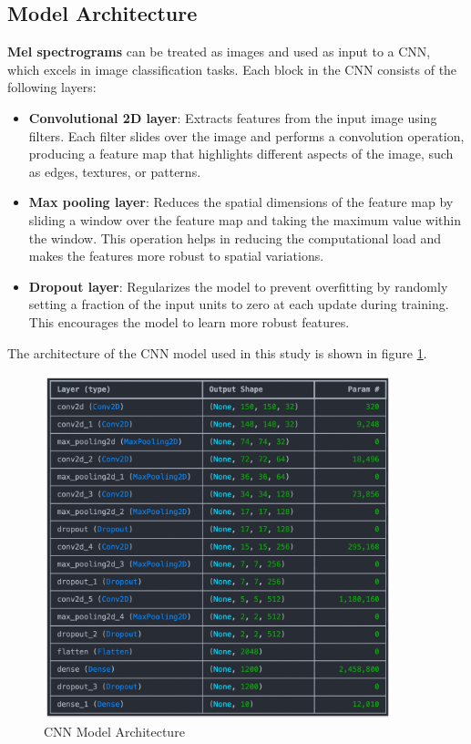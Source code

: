 \documentclass[11.5pt]{article}
\begin{document}
\subsection{Model Architecture}
\textbf{Mel spectrograms} can be treated as images and used as input to a CNN, which excels in image classification tasks. Each block in the CNN consists of the following layers:
\begin{itemize}
    \item \textbf{Convolutional 2D layer}: Extracts features from the input image using filters. Each filter slides over the image and performs a convolution operation, producing a feature map that highlights different aspects of the image, such as edges, textures, or patterns.
    \item \textbf{Max pooling layer}: Reduces the spatial dimensions of the feature map by sliding a window over the feature map and taking the maximum value within the window. This operation helps in reducing the computational load and makes the features more robust to spatial variations.
    \item \textbf{Dropout layer}: Regularizes the model to prevent overfitting by randomly setting a fraction of the input units to zero at each update during training. This encourages the model to learn more robust features.
\end{itemize}

The architecture of the CNN model \cite{ghildiyalMusicGenreClassification2020} used in this study is shown in figure \ref{fig:cnn_architecture}.
\begin{figure}[H]
    \centering
    \includegraphics[width=0.9\textwidth]{graphics/model_architecture.jpg}
    \caption{CNN Model Architecture}
    \label{fig:cnn_architecture}
\end{figure}
\end{document}
